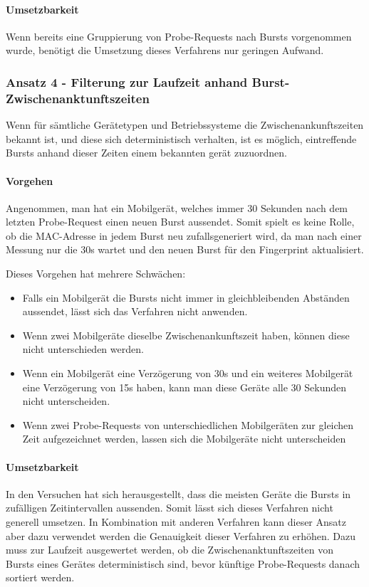 \paragraph{Umsetzbarkeit}
Wenn bereits eine Gruppierung von Probe-Requests nach Bursts vorgenommen wurde,
benötigt die Umsetzung dieses Verfahrens nur geringen Aufwand.

\subsubsection*{Ansatz 4 - Filterung zur Laufzeit anhand Burst-Zwischenanktunftszeiten}
Wenn für sämtliche Gerätetypen und Betriebssysteme die Zwischenankunftszeiten
bekannt ist, und diese sich deterministisch verhalten, ist es möglich, 
eintreffende Bursts anhand dieser Zeiten einem bekannten gerät zuzuordnen.

\paragraph{Vorgehen}
Angenommen, man hat ein Mobilgerät, welches immer 30 Sekunden nach dem 
letzten Probe-Request einen neuen Burst aussendet. 
Somit spielt es keine Rolle, ob die MAC-Adresse in jedem Burst neu 
zufallsgeneriert wird, da man nach einer Messung nur die 30s wartet und 
den neuen Burst für den Fingerprint aktualisiert.

Dieses Vorgehen hat mehrere Schwächen:
\begin{itemize}
    \item Falls ein Mobilgerät die Bursts nicht immer in gleichbleibenden 
    Abständen aussendet, lässt sich das Verfahren nicht anwenden.
    \item Wenn zwei Mobilgeräte dieselbe Zwischenankunftszeit haben, 
    können diese nicht unterschieden werden.
    \item Wenn ein Mobilgerät eine Verzögerung von 30s und ein weiteres 
    Mobilgerät eine Verzögerung von 15s haben, 
    kann man diese Geräte alle 30 Sekunden nicht unterscheiden.
    \item Wenn zwei Probe-Requests von unterschiedlichen Mobilgeräten 
    zur gleichen Zeit aufgezeichnet werden, 
    lassen sich die Mobilgeräte nicht unterscheiden

\end{itemize}

\paragraph{Umsetzbarkeit}
In den Versuchen hat sich herausgestellt, dass die meisten Geräte die 
Bursts in zufälligen Zeitintervallen aussenden. 
Somit lässt sich dieses Verfahren nicht generell umsetzen.
In Kombination mit anderen Verfahren kann dieser Ansatz aber dazu verwendet 
werden die Genauigkeit dieser Verfahren zu erhöhen. 
Dazu muss zur Laufzeit ausgewertet werden, ob die Zwischenanktunftszeiten 
von Bursts eines Gerätes deterministisch sind, bevor künftige Probe-Requests 
danach sortiert werden.

